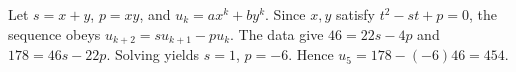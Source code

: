 Let $s=x+y$, $p=xy$, and $u_k=ax^k+by^k$. Since $x,y$ satisfy $t^2-st+p=0$, the sequence obeys $u_{k+2}=su_{k+1}-pu_k$. The data give $46=22s-4p$ and $178=46s-22p$. Solving yields $s=1$, $p=-6$. Hence $u_5=178-(-6)46=\boxed{454}$.
